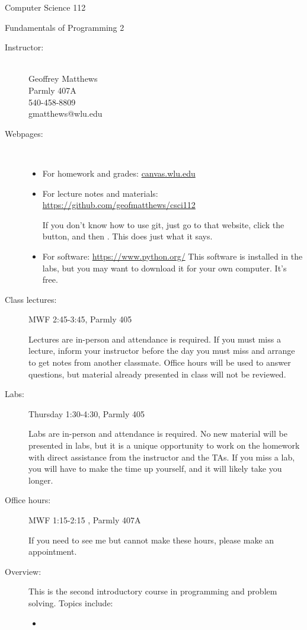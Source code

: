\documentclass[12pt]{article}
\begin{document}
\centerline{\Large Computer Science 112}
\centerline{\large Fundamentals of Programming 2}

\begin{description}
\item[Instructor:]
~\\ Geoffrey Matthews
\\ Parmly 407A
\\ 540-458-8809
\\ gmatthews@wlu.edu
\item[Webpages:]~
\begin{itemize}
\item For homework and grades: \url{canvas.wlu.edu}
\item For lecture notes and materials: 
\url{https://github.com/geofmatthews/csci112}

If you don't know how to use git, just go to that website,
click the  button, and then .
This does just what it says.
\item For software: \url{https://www.python.org/}
This software is installed in the labs, but you may want to
download it for your own computer.  It's free.

\end{itemize}
\item[Class lectures:]  MWF 2:45-3:45, Parmly 405

Lectures are in-person and attendance is required.  If you must miss a
lecture, inform your instructor before the day you must miss
and arrange to get notes from another classmate.  Office hours
will be used to answer questions, but material already presented
in class will not be reviewed.

\item[Labs:]  Thursday 1:30-4:30,  Parmly 405

Labs are in-person and attendance is required.
No new material will be presented in labs, but it is a 
unique opportunity to work on the homework with direct 
assistance from the instructor and the TAs.  If you miss
a lab, you will have to make the time up yourself, and it
will likely take you longer.

\item[Office hours:] MWF 1:15-2:15 , Parmly 407A

If you need to see me but
cannot make these hours, please  make an appointment.

\item[Overview:]
This is the second introductory course in programming and problem
solving.  Topics include:
\begin{itemize}
\item
\end{itemize}
 

\end{description}
\end{document}

